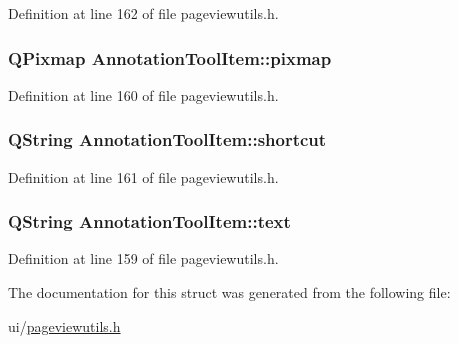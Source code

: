 Definition at line 162 of file pageviewutils.\+h.

\hypertarget{structAnnotationToolItem_a329b59ebf0a0064444d34874f41a70cb}{
\subsubsection[{pixmap}]{\setlength{\rightskip}{0pt plus 5cm}Q\+Pixmap Annotation\+Tool\+Item\+::pixmap}}\label{structAnnotationToolItem_a329b59ebf0a0064444d34874f41a70cb}


Definition at line 160 of file pageviewutils.\+h.

\hypertarget{structAnnotationToolItem_ad9bf3c20abf0ddfc1d1ff826cd3d3da5}{
\subsubsection[{shortcut}]{\setlength{\rightskip}{0pt plus 5cm}Q\+String Annotation\+Tool\+Item\+::shortcut}}\label{structAnnotationToolItem_ad9bf3c20abf0ddfc1d1ff826cd3d3da5}


Definition at line 161 of file pageviewutils.\+h.

\hypertarget{structAnnotationToolItem_a5a24d93be5ae5fba2c921b205c29b017}{
\subsubsection[{text}]{\setlength{\rightskip}{0pt plus 5cm}Q\+String Annotation\+Tool\+Item\+::text}}\label{structAnnotationToolItem_a5a24d93be5ae5fba2c921b205c29b017}


Definition at line 159 of file pageviewutils.\+h.



The documentation for this struct was generated from the following file\+:\begin{DoxyCompactItemize}
\item 
ui/\hyperlink{pageviewutils_8h}{pageviewutils.\+h}\end{DoxyCompactItemize}
